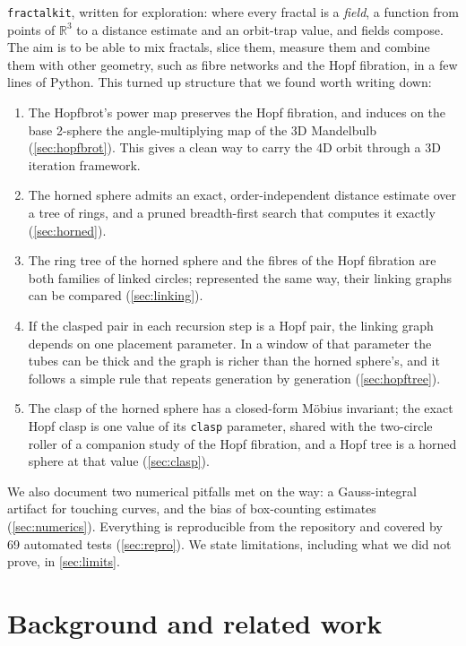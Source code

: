 \documentclass[11pt,a4paper]{article}
\theoremstyle{remark}
\newcommand{\R}{\mathbb{R}}
\newcommand{\code}[1]{\texttt{#1}}
\begin{document}
\code{fractalkit}, written for exploration: 
where every fractal is a \emph{field}, a function from points of $\R^3$ to a distance estimate and an
orbit-trap value, and fields compose.  The aim is to be able to mix fractals, slice them, measure them and
combine them with other geometry, such as fibre networks and the Hopf fibration, in a few lines of Python.
This turned up structure that we found worth writing down:

\begin{enumerate}[leftmargin=*,itemsep=2pt]
\item The Hopfbrot's power map preserves the Hopf fibration, and induces on the base 2-sphere the angle-multiplying
  map of the 3D Mandelbulb (\cref{sec:hopfbrot}).  This gives a clean way to carry the 4D orbit through a 3D
  iteration framework.
\item The horned sphere admits an exact, order-independent distance estimate over a tree of rings, and a pruned
  breadth-first search that computes it exactly (\cref{sec:horned}).
\item The ring tree of the horned sphere and the fibres of the Hopf fibration are both families of linked circles;
  represented the same way, their linking graphs can be compared (\cref{sec:linking}).
\item If the clasped pair in each recursion step is a Hopf pair, the linking graph depends on one placement
  parameter.  In a window of that parameter the tubes can be thick and the graph is richer than the horned
  sphere's, and it follows a simple rule that repeats generation by generation (\cref{sec:hopftree}).
\item The clasp of the horned sphere has a closed-form M\"obius invariant; the exact Hopf clasp is one value of its \code{clasp} parameter, shared with the two-circle roller of a companion study of the Hopf fibration, and a Hopf tree is a horned sphere at that value (\cref{sec:clasp}).
\end{enumerate}

We also document two numerical pitfalls met on the way: a Gauss-integral artifact for touching curves, and
the bias of box-counting estimates (\cref{sec:numerics}).  Everything is reproducible from the repository and covered
by 69 automated tests (\cref{sec:repro}).  We state limitations, including what we did not prove, in
\cref{sec:limits}.

\section{Background and related work}
\end{document}
